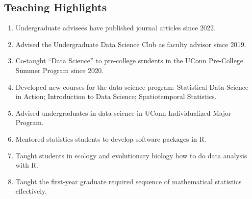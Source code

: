 \documentclass[Statistics]{vita}
\begin{document}
\begin{vita}
    \subsection{Teaching Highlights}
    \begin{enumerate}
    \item Undergraduate advisees have published journal articles since 2022.
    \item Advised the Undergraduate Data Science Club as faculty advisor since 2019.
    \item Co-taught ``Data Science'' to pre-college students in the UConn Pre-College Summer Program since 2020.
    \item Developed new courses for the data science program: Statistical Data Science in Action; Introduction to Data Science; Spatiotemporal Statistics.
    \item Advised undergraduates in data science in UConn Individualized Major Program.
    \item Mentored statistics students to develop software packages in R.
    \item Taught students in ecology and evolutionary biology how to do data analysis with R.
    \item Taught the first-year graduate required sequence of mathematical statistics effectively.
    \end{enumerate}

\end{vita}
\end{document}
